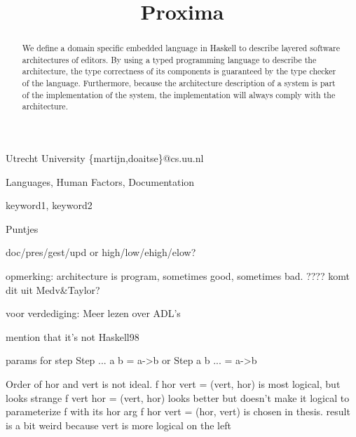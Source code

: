 \documentclass[preprint,natbib]{sigplanconf}
\begin{document}
\copyrightdata{[to be supplied]} 

\preprintfooter{\version}   %

\title{Proxima}

           {Utrecht University}
           {\{martijn,doaitse\}@cs.uu.nl}

\maketitle

\begin{abstract}
We define a domain specific embedded language in Haskell to describe
layered software architectures of editors. By using a typed programming
language to describe the architecture, the type correctness of its components
is guaranteed by the type checker of the language. Furthermore, because the
architecture description of a system is part of the implementation of the
system, the implementation will always comply with the architecture.
\end{abstract}

\newcommand{\oo}{{\;\protect\raisebox{.3ex}{\tiny ${\circ}$}\;}}


\terms
Languages, Human Factors, Documentation

\keywords
keyword1, keyword2



\bc
Puntjes

doc/pres/gest/upd or high/low/ehigh/elow?

opmerking: architecture is program, sometimes good, sometimes bad. ???? komt dit uit Medv&Taylor?

voor verdediging: Meer lezen over ADL's


mention that it's not Haskell98

params for step Step ... a b = a->b or Step a b ... = a->b


Order of hor and vert is not ideal.  
f hor vert = (vert, hor) is most logical, but looks strange
f vert hor = (vert, hor) looks better but doesn't make it logical to parameterize f with its hor arg
f hor vert = (hor, vert) is chosen in thesis. result is a bit weird because vert is more logical on the left
\end{document}
